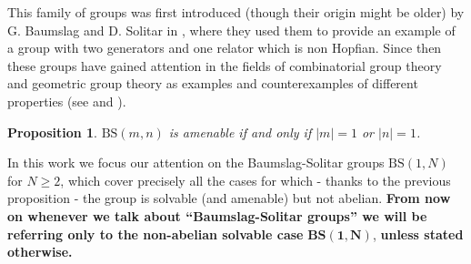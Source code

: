 \documentclass[letterpaper,10pt]{article}
\theoremstyle{plain}
\newtheorem{proposition}[theorem]{Proposition}
\begin{document}
This family of groups was first introduced (though their origin might be older) by G. Baumslag and D. Solitar in \cite{baumslag_solitar_1962}, where they used them to provide an example of a group with two generators and one relator which is non Hopfian. Since then these groups have gained attention in the fields of combinatorial group theory and geometric group theory as examples and counterexamples of different properties (see \cite{harpe_2003} and \cite{meskin_1972}).

\begin{proposition}\label{prop.bs_is_amenable} $\mathrm{BS}(m,n)$ is amenable if and only if $|m|=1$ or $|n|=1$.
\end{proposition}

In this work we focus our attention on the Baumslag-Solitar groups $\mathrm{BS}(1,N)$ for $N\ge 2$, which cover precisely all the cases for which - thanks to the previous proposition - the group is solvable (and amenable) but not abelian. \textbf{From now on whenever we talk about ``Baumslag-Solitar groups'' we will be referring only to the non-abelian solvable case} $\mathbf{BS(1,N)}$, \textbf{unless stated otherwise.}
\end{document}
